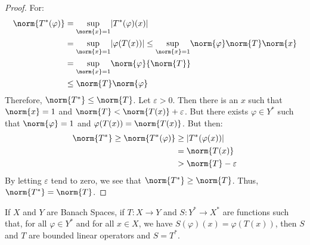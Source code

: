 \documentclass[crop=false,class=book,oneside]{standalone}                      %
\begin{document}
        \begin{proof}
            For:
            \begin{subequations}
                \begin{align}
                    \norm{T^{*}(\varphi)}&=
                    \underset{\norm{x}=1}{\sup}|T^{*}(\varphi)(x)|\\
                    &=\underset{\norm{x}=1}{\sup}|\varphi(T(x))|\leq
                    \underset{\norm{x}=1}{\sup}
                        \norm{\varphi}\norm{T}\norm{x}\\
                    &=\underset{\norm{x}=1}{\sup}
                        \norm{\varphi}{\norm{T}}\\
                    &\leq\norm{T}\norm{\varphi}
                \end{align}
            \end{subequations}
            Therefore, $\norm{T^{*}}\leq\norm{T}$. Let
            $\varepsilon>0$. Then there is an $x$ such that
            $\norm{x}=1$ and $\norm{T}<\norm{T(x)}+\varepsilon$.
            But there exists $\varphi\in{Y}^{*}$ such that
            $\norm{\varphi}=1$ and $\varphi(T(x))=\norm{T(x)}$.
            But then:
            \begin{subequations}
                \begin{align}
                    \norm{T^{*}}\geq\norm{T^{*}(\varphi)}
                    &\geq|T^{*}(\varphi(x))|\\
                    &=\norm{T(x)}\\
                    &>\norm{T}-\varepsilon
                \end{align}
            \end{subequations}
            By letting $\varepsilon$ tend to zero, we see that
            $\norm{T^{*}}\geq\norm{T}$. Thus,
            $\norm{T^{*}}=\norm{T}$.
        \end{proof}
        \begin{theorem}
            If $X$ and $Y$ are Banach Spaces, if $T:X\rightarrow{Y}$
            and $S:Y^{*}\rightarrow{X}^{*}$ are functions such
            that, for all $\varphi\in{Y}^{*}$ and for all $x\in{X}$,
            we have $S(\varphi)(x)=\varphi(T(x))$, then $S$ and $T$
            are bounded linear operators and $S=T^{*}$.
        \end{theorem}
\end{document}
